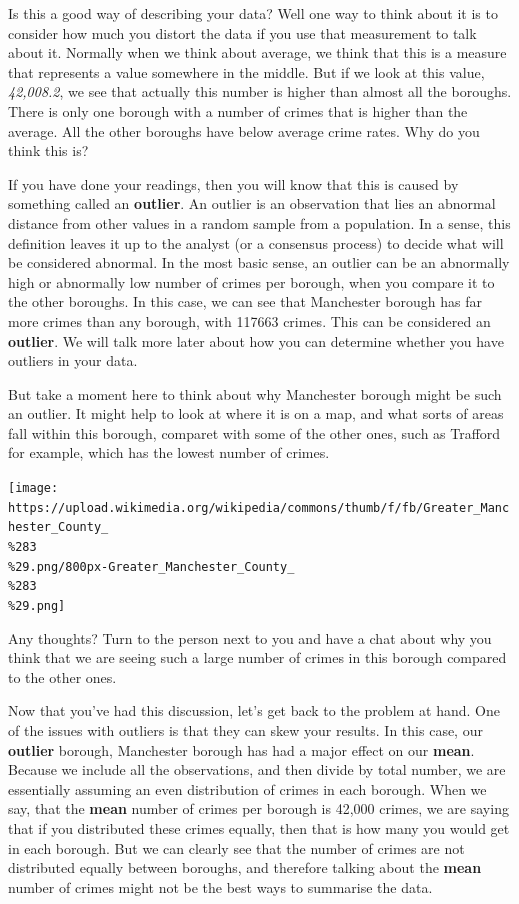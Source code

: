 \documentclass[]{book}
\theoremstyle{definition}
\theoremstyle{definition}
\theoremstyle{definition}
\theoremstyle{remark}
\begin{document}
Is this a good way of describing your data? Well one way to think about
it is to consider how much you distort the data if you use that
measurement to talk about it. Normally when we think about average, we
think that this is a measure that represents a value somewhere in the
middle. But if we look at this value, \emph{42,008.2}, we see that
actually this number is higher than almost all the boroughs. There is
only one borough with a number of crimes that is higher than the
average. All the other boroughs have below average crime rates. Why do
you think this is?

If you have done your readings, then you will know that this is caused
by something called an \textbf{outlier}. An outlier is an observation
that lies an abnormal distance from other values in a random sample from
a population. In a sense, this definition leaves it up to the analyst
(or a consensus process) to decide what will be considered abnormal. In
the most basic sense, an outlier can be an abnormally high or abnormally
low number of crimes per borough, when you compare it to the other
boroughs. In this case, we can see that Manchester borough has far more
crimes than any borough, with 117663 crimes. This can be considered an
\textbf{outlier}. We will talk more later about how you can determine
whether you have outliers in your data.

But take a moment here to think about why Manchester borough might be
such an outlier. It might help to look at where it is on a map, and what
sorts of areas fall within this borough, comparet with some of the other
ones, such as Trafford for example, which has the lowest number of
crimes.

\texttt{[image: https://upload.wikimedia.org/wikipedia/commons/thumb/f/fb/Greater\_Manchester\_County\_\\\%283\\\%29.png/800px-Greater\_Manchester\_County\_\\\%283\\\%29.png]}

Any thoughts? Turn to the person next to you and have a chat about why
you think that we are seeing such a large number of crimes in this
borough compared to the other ones.

Now that you've had this discussion, let's get back to the problem at
hand. One of the issues with outliers is that they can skew your
results. In this case, our \textbf{outlier} borough, Manchester borough
has had a major effect on our \textbf{mean}. Because we include all the
observations, and then divide by total number, we are essentially
assuming an even distribution of crimes in each borough. When we say,
that the \textbf{mean} number of crimes per borough is 42,000 crimes, we
are saying that if you distributed these crimes equally, then that is
how many you would get in each borough. But we can clearly see that the
number of crimes are not distributed equally between boroughs, and
therefore talking about the \textbf{mean} number of crimes might not be
the best ways to summarise the data.
\end{document}
